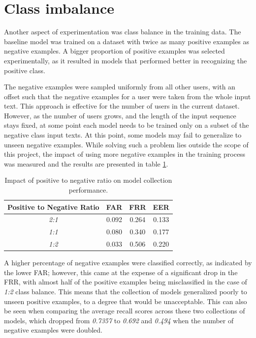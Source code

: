 \section{Class imbalance}
Another aspect of experimentation was class balance in the training data. The baseline model was trained on a dataset with twice as many positive examples as negative examples. A bigger proportion of positive examples was selected experimentally, as it resulted in models that performed better in recognizing the positive class.
 
The negative examples were sampled uniformly from all other users, with an offset such that the negative examples for a user were taken from the whole input text. This approach is effective for the number of users in the current dataset. However, as the number of users grows, and the length of the input sequence stays fixed, at some point each model needs to be trained only on a subset of the negative class input texts. At this point, some models may fail to generalize to unseen negative examples. 
While solving such a problem lies outside the scope of this project, the impact of using more negative examples in the training process was measured and the results are presented in table \ref{table:egde_encoding_comp}.


\begin{center}
	\begin{table}[H]
		\begin{center}
			\begin{tabular}{ |c|c|c|c| } 
				\hline
				Positive to Negative Ratio & FAR & FRR & EER \\
				\hline
				\textit{2:1} & 0.092 & 0.264 & 0.133 \\
				\hline
				\textit{1:1} & 0.080 & 0.340 & 0.177 \\
				\hline
				\textit{1:2} & 0.033 & 0.506 & 0.220 \\
				\hline
			\end{tabular}
		\end{center}
		\caption{Impact of positive to negative ratio on model collection performance.}
		\label{table:egde_encoding_comp}
	\end{table}
\end{center}

A higher percentage of negative examples were classified correctly, as indicated by the lower FAR; however, this came at the expense of a significant drop in the FRR, with almost half of the positive examples being misclassified in the case of \textit{1:2} class balance. This means that the collection of models generalized poorly to unseen positive examples, to a degree that would be unacceptable. This can also be seen when comparing the average recall scores across these two collections of models, which dropped from \textit{0.7357} to \textit{0.692} and \textit{0.494} when the number of negative examples were doubled. 


